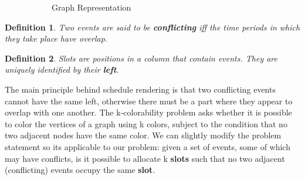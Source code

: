 \documentclass[12pt]{article}
\newtheorem{definition}{Definition}
\begin{document}
\begin{figure}[H]
\begin{subfigure}{.6\textwidth}
        \caption{Graph Representation}
        \label{fig:graphexp1}
    \end{subfigure}%
    \caption{}
    \label{}
\end{figure}

\begin{definition}
    Two events are said to be \textbf{conflicting} iff the time periods in which they take place have overlap.
\end{definition}

\begin{definition}
    Slots are positions in a column that contain events. They are uniquely identified by their \textbf{left}.
\end{definition}

The main principle behind schedule rendering is that two conflicting events cannot have the same left, otherwise there must be a part where they appear to overlap with one another.
The k-colorability problem asks whether it is possible to color the vertices of a graph using k colors, subject to the condition that no two adjacent nodes have the same color. We can slightly modify the problem statement so its applicable to our problem: given a set of events, some of which may have conflicts, is it possible to allocate k \textbf{slots} such that no two adjacent (conflicting) events occupy the same \textbf{slot}.
\end{document}

